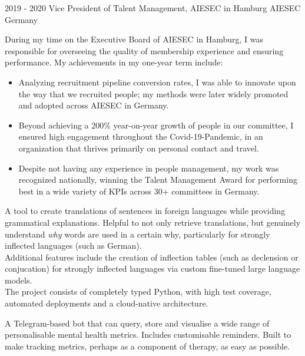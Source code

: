 \documentclass[9pt]{developercv} %
\begin{document}
\begin{entrylist}
	\entry
		{2019 - 2020}
		{Vice President of Talent Management, AIESEC in Hamburg}
		{AIESEC Germany}
		{During my time on the Executive Board of AIESEC in Hamburg, I was responsible for overseeing the quality of membership experience and ensuring performance. My achievements in my one-year term include:

        \begin{itemize}
            \item Analyzing recruitment pipeline conversion rates, I was able to innovate upon the way that we recruited people; my methods were later widely promoted and adopted across AIESEC in Germany.
            \item   Beyond achieving a 200\% year-on-year growth of people in our committee, I ensured high engagement throughout the Covid-19-Pandemic, in an organization that thrives primarily on personal contact and travel.
            \item     Despite not having any experience in people management, my work was recognized nationally, winning the Talent Management Award for performing best in a wide variety of KPIs across 30+ committees in Germany.
        \end{itemize}  
        }
\end{entrylist}




\begin{entrylist}
	\project
		{}
		{
        A tool to create translations of sentences in foreign languages while providing grammatical explanations. Helpful to not only retrieve translations, but genuinely understand \textit{why} words are used in a certain why, particularly for strongly inflected languages (such as German). \\

        Additional features include the creation of inflection tables (such as declension or conjucation) for strongly inflected languages via custom fine-tuned large language models. \\

        The project consists of completely typed Python, with high test coverage, automated deployments and a cloud-native architecture.
        }
 
    \project
        {}
        {
        A Telegram-based bot that can query, store and visualise a wide range of personalisable mental health metrics. Includes customisable reminders. Built to make tracking metrics, perhaps as a component of therapy, as easy as possible.
        }
\end{entrylist}
\end{document}
